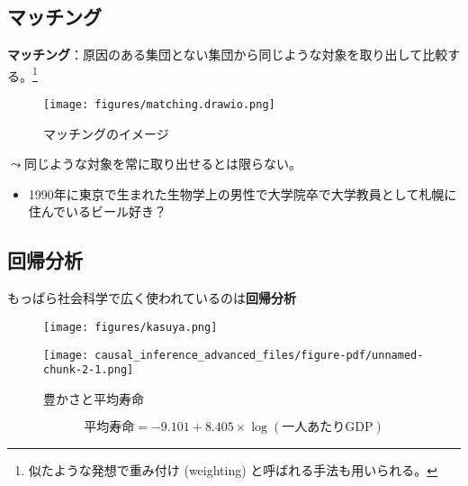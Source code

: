 \documentclass[
  xelatex,
  ja=standard]{bxjsarticle}
\providecommand{\tightlist}{%
  \setlength{\itemsep}{0pt}\setlength{\parskip}{0pt}}\usepackage{longtable,booktabs,array}
\begin{document}
\hypertarget{ux30deux30c3ux30c1ux30f3ux30b0}{%
\subsection{マッチング}\label{ux30deux30c3ux30c1ux30f3ux30b0}}

\textbf{マッチング}：原因のある集団とない集団から同じような対象を取り出して比較する。\footnote{似たような発想で重み付け
  (weighting) と呼ばれる手法も用いられる。}

\begin{figure}[htpb]

{\centering \texttt{[image: figures/matching.drawio.png]}

}

\caption{マッチングのイメージ}

\end{figure}

\(\leadsto\)同じような対象を常に取り出せるとは限らない。

\begin{itemize}
\tightlist
\item
  1990年に東京で生まれた生物学上の男性で大学院卒で大学教員として札幌に住んでいるビール好き？
\end{itemize}

\hypertarget{ux56deux5e30ux5206ux6790}{%
\subsection{回帰分析}\label{ux56deux5e30ux5206ux6790}}

もっぱら社会科学で広く使われているのは\textbf{回帰分析}\citep{kasuya2018}

\begin{figure}[htpb]

{\centering \texttt{[image: figures/kasuya.png]}

}

\caption{\citet{kasuya2018}}

\end{figure}

\begin{figure}[htpb]

{\centering \texttt{[image: causal\_inference\_advanced\_files/figure-pdf/unnamed-chunk-2-1.png]}

}

\caption{豊かさと平均寿命}

\end{figure}

\[
\textrm{平均寿命} = -9.101 + 8.405 \times \log(\textrm{一人あたりGDP})
\]
\end{document}
